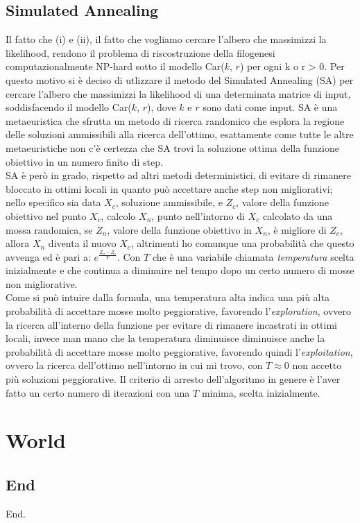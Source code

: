 \documentclass{report}
\begin{document}
\section{Simulated Annealing}
  Il fatto che (i) e (ii), il fatto che vogliamo cercare l'albero che massimizzi la likelihood, rendono il problema di riscostruzione della filogenesi computazionalmente NP-hard sotto il modello Car($k$, $r$) per ogni k o r > 0. Per questo motivo si è deciso di utlizzare il metodo del Simulated Annealing (SA) per cercare l'albero che massimizzi la likelihood di una determinata matrice di input, soddisfacendo il modello Car($k$, $r$), dove $k$ e $r$ sono dati come input.
  SA è una metaeuristica che sfrutta un metodo di ricerca randomico che esplora la regione delle soluzioni ammissibili alla ricerca dell'ottimo, esattamente come tutte le altre metaeuristiche non c'è certezza che SA trovi la soluzione ottima della funzione obiettivo in un numero finito di step.\\
  SA è però in grado, rispetto ad altri metodi deterministici, di evitare di rimanere bloccato in ottimi locali in quanto può accettare anche step non migliorativi; nello specifico sia data $X_{c}$, soluzione ammissibile, e $Z_{c}$, valore della funzione obiettivo nel punto $X_{c}$, calcolo $X_{n}$, punto nell'intorno di $X_{c}$ calcolato da una mossa randomica, se $Z_{n}$, valore della funzione obiettivo in $X_{n}$, è migliore di $Z_{c}$, allora $X_{n}$ diventa il nuovo $X_{c}$, altrimenti ho comunque una probabilità che questo avvenga ed è pari a: $e^{\frac{Z_{n}-Z_{c}}{T}}$.
  Con $T$ che è una variabile chiamata \emph{temperatura} scelta inizialmente e che continua a diminuire nel tempo dopo un certo numero di mosse non migliorative.\\
  Come si può intuire dalla formula, una temperatura alta indica una più alta probabilità di accettare mosse molto peggiorative, favorendo l'\emph{exploration}, ovvero la ricerca all'interno della funzione per evitare di rimanere incastrati in ottimi locali, invece man mano che la temperatura diminuisce diminuisce anche la probabilità di accettare mosse molto peggiorative, favorendo quindi l'\emph{exploitation}, ovvero la ricerca dell'ottimo nell'intorno in cui mi trovo, con $T\approx 0$ non accetto più soluzioni peggiorative. Il criterio di arresto dell'algoritmo in genere è l'aver fatto un certo numero di iterazioni con una $T$ minima, scelta inizialmente.  

\chapter{World}

\section{End}
  End.
\end{document}
